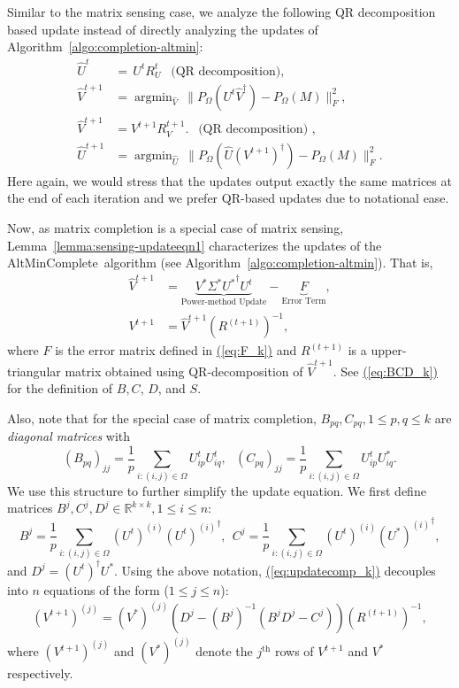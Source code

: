 \documentclass[11pt]{article}
\renewcommand{\eqref}[1]{\hyperref[#1]{(\ref*{#1})}}
\theoremstyle{plain}
\theoremstyle{definition}
\DeclareMathOperator*{\argmin}{argmin}
\newcommand{\Vt}{V^{t+1}}
\newcommand{\Ut}{U^{t}}
\newcommand{\Vo}{V^*}
\newcommand{\Uo}{U^*}
\newcommand{\amc}{AltMinComplete\ }
\begin{document}
Similar to the matrix sensing case, we analyze the following QR decomposition based update instead of directly analyzing the updates of Algorithm~\ref{algo:completion-altmin}:
\begin{align}
\widehat{U}^{t}&= \, U^{t}R_U^{t}\ \ \text{ (QR decomposition), }\nonumber\\
\widehat{V}^{t+1}&=\argmin_{\widehat{V}} \  \|P_{\Omega}(U^t\widehat{V}^\dag)-P_{\Omega}(M)\|_F^2,\nonumber\\ 
\widehat{V}^{t+1}&=V^{t+1}R_V^{t+1}.\ \ \text{ (QR decomposition) },\nonumber\\ 
\widehat{U}^{t+1}&=\argmin_{\widehat{U}} \  \|P_{\Omega}(\widehat{U}(V^{t+1})^\dag)-P_{\Omega}(M)\|_F^2.\label{eq:updatecomp_k1}
\end{align}
Here again, we would stress that the updates output exactly the same matrices at the end of each iteration and we prefer QR-based updates due to notational ease. 

Now, as matrix completion is a special case of matrix sensing, Lemma~\ref{lemma:sensing-updateeqn1} characterizes the updates of the \amc algorithm (see Algorithm~\ref{algo:completion-altmin}). That is, 
\begin{align}
  \widehat{V}^{t+1} &= \underbrace{V^*\Sigma^*{U^*}^\dag  U^{t}}_{\text{Power-method Update}} - \underbrace{F}_{\text{Error Term}}, \nonumber\\
  V^{t+1}&=\widehat{V}^{t+1}(R^{(t+1)})^{-1},\label{eq:updatecomp_k}
\end{align}
where $F$ is the error matrix defined in \eqref{eq:F_k} and $R^{(t+1)}$ is a upper-triangular matrix obtained using QR-decomposition of $\widehat{V}^{t+1}$. See \eqref{eq:BCD_k} for the definition of  $B, C$, $D$, and $S$. 

Also, note that for the special case of matrix completion, $B_{pq}, C_{pq}, 1\leq p,q\leq k$ are {\em diagonal matrices} with $$(B_{pq})_{jj}=\frac{1}{p}\sum_{i:(i,j)\in \Omega}\Ut_{ip}\Ut_{iq},\ \ \ (C_{pq})_{jj}=\frac{1}{p}\sum_{i:(i,j)\in \Omega}\Ut_{ip}\Uo_{iq}.$$ We use this structure to further simplify the update equation. We first define matrices $B^j, C^j, D^j\in \mathbb{R}^{k\times k}, 1\leq i\leq n$: {\small $$B^j=\frac{1}{p}\sum_{i:(i,j)\in \Omega} (\Ut)^{(i)}{(\Ut)^{(i)}}^\dag , \ \ C^j=\frac{1}{p}\sum_{i:(i,j)\in\Omega} (\Ut)^{(i)}{(\Uo)^{(i)}}^\dag,$$} and $D^j=(\Ut)^\dag \Uo$. 
 Using the above notation, \eqref{eq:updatecomp_k} decouples into $n$ equations of the form ($1\leq j\leq n$):
 \begin{align}\label{eqn:sampling-updateeqn-decoupled}
    (\Vt)^{(j)} = (\Vo)^{(j)} (D^j-(B^j)^{-1}(B^jD^j-C^j)) (R^{(t+1)})^{-1},
 \end{align}
 where $(\Vt)^{(j)}$ and $(\Vo)^{(j)}$ denote the $j^{\textrm{th}}$ rows of $\Vt$ and $\Vo$ respectively.
\end{document}
